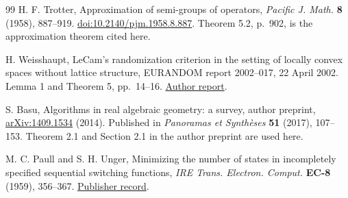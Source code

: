 \begin{thebibliography}{99}
H. F. Trotter, Approximation of semi-groups of operators,
\emph{Pacific J. Math.} \textbf{8} (1958), 887--919.
\href{https://doi.org/10.2140/pjm.1958.8.887}{doi:10.2140/pjm.1958.8.887}.
Theorem 5.2, p.~902, is the approximation theorem cited here.



H. Weisshaupt, LeCam's randomization criterion in the setting of locally
convex spaces without lattice structure, EURANDOM report 2002--017,
22 April 2002. Lemma 1 and Theorem 5, pp.~14--16.
\href{https://www.eurandom.tue.nl/reports/2002/017-report.pdf}{Author report}.

S. Basu, Algorithms in real algebraic geometry: a survey, author preprint,
\href{https://arxiv.org/abs/1409.1534}{arXiv:1409.1534} (2014).
Published in \emph{Panoramas et Synth\`eses} \textbf{51} (2017), 107--153.
Theorem 2.1 and Section 2.1 in the author preprint are used here.

M. C. Paull and S. H. Unger, Minimizing the number of states in incompletely
specified sequential switching functions, \emph{IRE Trans. Electron.
Comput.} \textbf{EC-8} (1959), 356--367.
\href{https://ieeexplore.ieee.org/document/5222697}{Publisher record}.

\end{thebibliography}

